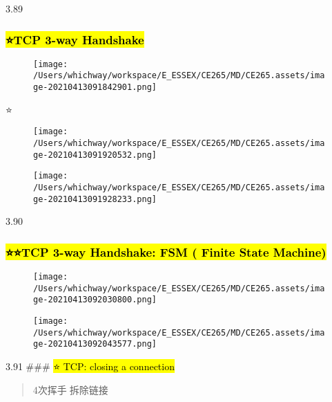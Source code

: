 \documentclass[
]{article}
\begin{document}
3.89

\hypertarget{tcp-3-way-handshake}{%
\subsubsection{\texorpdfstring{\hl{⭐️TCP 3-way
Handshake}}{⭐️TCP 3-way Handshake}}\label{tcp-3-way-handshake}}

\begin{figure}
\centering
\texttt{[image: /Users/whichway/workspace/E\_ESSEX/CE265/MD/CE265.assets/image-20210413091842901.png]}
\caption{}
\end{figure}

⭐️

\begin{figure}
\centering
\texttt{[image: /Users/whichway/workspace/E\_ESSEX/CE265/MD/CE265.assets/image-20210413091920532.png]}
\caption{}
\end{figure}

\begin{figure}
\centering
\texttt{[image: /Users/whichway/workspace/E\_ESSEX/CE265/MD/CE265.assets/image-20210413091928233.png]}
\caption{}
\end{figure}

3.90

\hypertarget{tcp-3-way-handshake-fsm--finite-state-machine}{%
\subsubsection{\texorpdfstring{\hl{⭐️⭐️TCP 3-way Handshake: FSM ( Finite
State
Machine)}}{⭐️⭐️TCP 3-way Handshake: FSM ( Finite State Machine)}}\label{tcp-3-way-handshake-fsm--finite-state-machine}}

\begin{figure}
\centering
\texttt{[image: /Users/whichway/workspace/E\_ESSEX/CE265/MD/CE265.assets/image-20210413092030800.png]}
\caption{}
\end{figure}

\begin{figure}
\centering
\texttt{[image: /Users/whichway/workspace/E\_ESSEX/CE265/MD/CE265.assets/image-20210413092043577.png]}
\caption{}
\end{figure}

3.91 \#\#\# \hl{⭐️ TCP: closing a connection}

\begin{quote}
4次挥手🙋拆除链接🔗
\end{quote}
\end{document}
